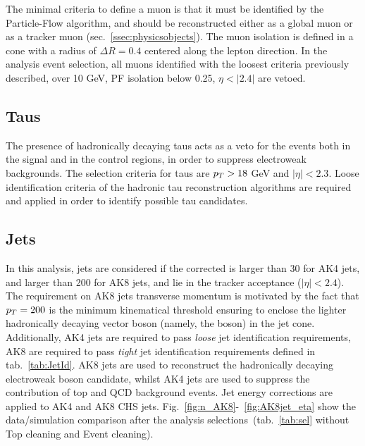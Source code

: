 The minimal criteria to define a muon is that it must be identified by the Particle-Flow algorithm, and should be reconstructed either as a global muon or as a tracker muon (sec.~\ref{ssec:physicsobjects}). The muon isolation is defined in a cone with a radius of $\Delta R=0.4$ centered along the lepton direction. In the analysis event selection, all muons identified with the loosest criteria previously described, \pt over 10 GeV, PF isolation below 0.25, $\eta<|2.4|$ are vetoed.
 


\subsection{Taus}\label{ssec:tau}
The presence of hadronically decaying taus acts as a veto for the events both in the signal and in the control regions, in order to suppress electroweak backgrounds. The selection criteria for taus are $p_T > 18$ GeV and $|\eta| < 2.3$. Loose identification criteria of the hadronic tau reconstruction algorithms are required and applied in order to identify possible tau candidates.


\subsection{Jets}\label{ssec:jets}
In this analysis, jets are considered if the corrected \pt is larger than 30 \GeV for AK4 jets, and larger than 200 \GeV for AK8 jets, and lie in the tracker acceptance ($|\eta|<2.4$). The requirement on AK8 jets transverse momentum is motivated by the fact that $p_T = 200$ \GeV is the minimum kinematical threshold ensuring to enclose the lighter hadronically decaying vector boson (namely, the \W boson) in the jet cone. Additionally, AK4 jets are required to pass \emph{loose} jet identification requirements, AK8 are required to pass \emph{tight} jet identification requirements defined in tab.~\ref{tab:JetId}. AK8 jets are used to reconstruct the hadronically decaying electroweak boson candidate, whilst AK4 jets are used to suppress the contribution of top and QCD background events. Jet energy corrections are applied to AK4 and AK8 CHS jets. Fig.~\ref{fig:n_AK8}-~\ref{fig:AK8jet_eta} show the data/simulation comparison after the analysis selections~(tab.~\ref{tab:sel} without Top cleaning and Event cleaning).

